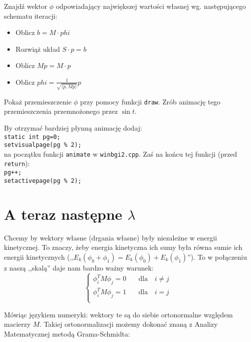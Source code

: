 \documentclass{instrukcja}
\begin{document}
\begin{zad}
Znajdź wektor $\phi$ odpowiadający największej wartości własnej wg. następującego schematu iteracji:
\begin{itemize}
\item Oblicz $b = M\cdot phi$
\item Rozwiąż układ $S\cdot p = b$
\item Oblicz $Mp = M\cdot p$
\item Oblicz $phi = \frac{1}{\sqrt{\langle p, Mp \rangle}} p$
\end{itemize}
\end{zad}

\begin{zad}
Pokaż przemieszczenie $\phi$ przy pomocy funkcji {\tt draw}. Zrób animację tego przemieszczenia przemnożonego przez $\sin{t}$.
\end{zad}

\begin{zad}
By otrzymać bardziej płynną animację dodaj:\\
{\tt static int pg=0; }\\
{\tt setvisualpage(pg \% 2);}\\
na początku funkcji {\tt animate} w {\tt winbgi2.cpp}. Zaś na końcu tej funkcji (przed  {\tt return}):\\
{\tt pg++;}\\
{\tt setactivepage(pg \% 2);}\\
\end{zad}

\section{A teraz następne $\lambda$}
Chcemy by wektory własne (drgania własne) były niezależne w energii kinetycznej. To znaczy, żeby energia kinetyczna ich sumy była równa sumie ich energii kinetycznych (,,$E_k(\phi_0+\phi_1) = E_k(\phi_0)+E_k(\phi_1)$''). To w połączeniu z naszą ,,skalą'' daje nam bardzo ważny warunek:
\[\begin{cases}
\phi_i^T M \phi_j = 0 &\quad \text{dla}\quad i\neq j \\
\phi_i^T M \phi_j = 1 &\quad \text{dla}\quad i = j \\
\end{cases}\]

Mówiąc językiem numeryki: wektory te są do siebie ortonormalne względem macierzy $M$. Takiej ortonormalizacji możemy dokonać znaną z Analizy Matematycznej metodą Grama-Schmidta:
\end{document}
